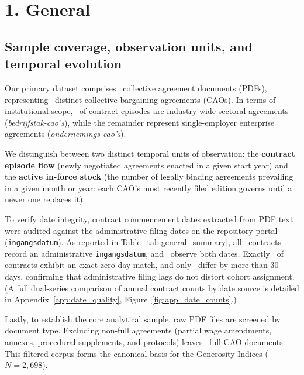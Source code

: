 \section*{1. General}
\label{sec:general}

\subsection*{Sample coverage, observation units, and temporal evolution}

Our primary dataset comprises \GenTotalContracts\ collective agreement documents (PDFs), representing \GenUniqueCAOs\ distinct collective bargaining agreements (CAOs). In terms of institutional scope, \GenShareSectoral\ of contract episodes are industry-wide sectoral agreements (\emph{bedrijfstak-cao's}), while the remainder represent single-employer enterprise agreements (\emph{ondernemings-cao's}).

We distinguish between two distinct temporal units of observation: the \textbf{contract episode flow} (newly negotiated agreements enacted in a given start year) and the \textbf{active in-force stock} (the number of legally binding agreements prevailing in a given month or year: each CAO's most recently filed edition governs until a newer one replaces it).

To verify date integrity, contract commencement dates extracted from PDF text were audited against the administrative filing dates on the repository portal (\texttt{ingangsdatum}). As reported in Table~\ref{tab:general_summary}, all \GenTotalContracts\ contracts record an administrative \texttt{ingangsdatum}, and \GenBothDatesCount\ observe both dates. Exactly \GenExactDateMatch\ of contracts exhibit an exact zero-day match, and only \GenDateDiffGtThirty\ differ by more than 30 days, confirming that administrative filing lags do not distort cohort assignment. (A full dual-series comparison of annual contract counts by date source is detailed in Appendix~\ref{app:date_quality}, Figure~\ref{fig:app_date_counts}.) 

Lastly, to establish the core analytical sample, raw PDF files are screened by document type. Excluding non-full agreements (partial wage amendments, annexes, procedural supplements, and protocols) leaves \GenFullCAOCount\ full CAO documents. This filtered corpus forms the canonical basis for the Generosity Indices ($N = 2,698$).

\begin{table}[H]
    \centering
    \caption{Key descriptive statistics for the general CAO dataset}
    \label{tab:general_summary}
    
\end{table}


